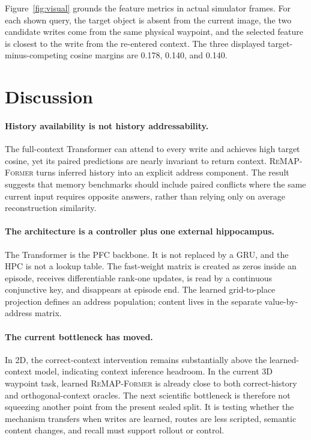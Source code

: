 \documentclass{article}
\newcommand{\model}{\textsc{ReMAP-Former}}
\newcommand{\hpc}{\textsc{HPC}}
\newcommand{\pfc}{\textsc{PFC}}
\begin{document}
Figure~\ref{fig:visual} grounds the feature metrics in actual simulator frames.
For each shown query, the target object is absent from the current image, the two candidate writes come from the same physical waypoint, and the selected feature is closest to the write from the re-entered context.
The three displayed target-minus-competing cosine margins are 0.178, 0.140, and 0.140.

\section{Discussion}

\paragraph{History availability is not history addressability.}
The full-context Transformer can attend to every write and achieves high target cosine, yet its paired predictions are nearly invariant to return context.
\model{} turns inferred history into an explicit address component.
The result suggests that memory benchmarks should include paired conflicts where the same current input requires opposite answers, rather than relying only on average reconstruction similarity.

\paragraph{The architecture is a controller plus one external hippocampus.}
The Transformer is the \pfc{} backbone.
It is not replaced by a GRU, and the \hpc{} is not a lookup table.
The fast-weight matrix is created as zeros inside an episode, receives differentiable rank-one updates, is read by a continuous conjunctive key, and disappears at episode end.
The learned grid-to-place projection defines an address population; content lives in the separate value-by-address matrix.

\paragraph{The current bottleneck has moved.}
In 2D, the correct-context intervention remains substantially above the learned-context model, indicating context inference headroom.
In the current 3D waypoint task, learned \model{} is already close to both correct-history and orthogonal-context oracles.
The next scientific bottleneck is therefore not squeezing another point from the present sealed split.
It is testing whether the mechanism transfers when writes are learned, routes are less scripted, semantic content changes, and recall must support rollout or control.
\end{document}
